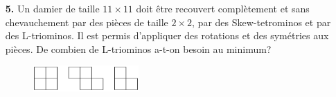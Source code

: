 \documentclass[11pt,a4paper]{article}
\theoremstyle{plain}
\theoremstyle{definition}
\theoremstyle{remark}
\begin{document}
\begin{enumerate}
\bigskip


\item[\textbf{5.}] 
Un damier de taille $11\times 11$ doit être recouvert complètement et sans chevauchement par des pièces de taille $2\times 2$, par des Skew-tetrominos et par des L-triominos.
Il est permis d'appliquer des rotations et des symétries aux pièces. 
De combien de L-triominos a-t-on besoin au minimum?

\begin{figure}[h]
\center
\includegraphics[height=1cm]{kacheln3.png}
\end{figure}

\bigskip
\end{enumerate}


\vspace{1.5cm} 

\end{document}
